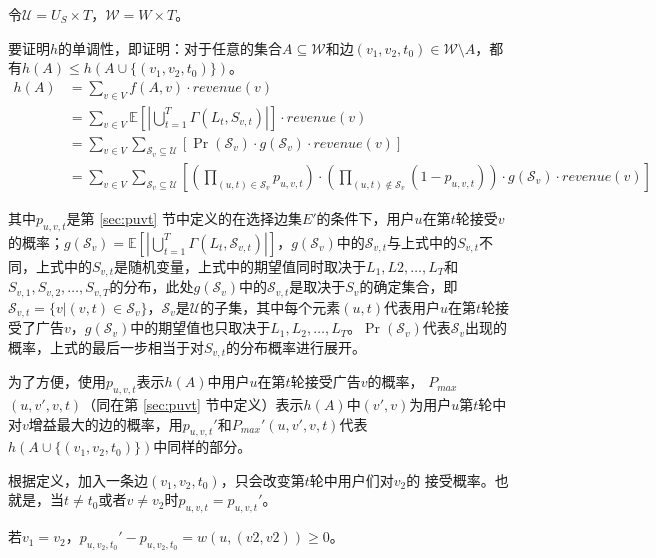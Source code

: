 令$\mathcal{U}=U_S \times T$，$\mathcal{W}=W \times T$。

要证明$h$的单调性，即证明：对于任意的集合$A \subseteq \mathcal{W}$和边$(v_1,v_2,t_0) \in \mathcal{W}\setminus A$，都有$h(A)\le h(A\cup\{(v_1,v_2,t_0)\})$。
\begin{align}
    h(A)&=\sum_{v \in V} f(A,v)\cdot revenue(v) \\ 
    &=\sum_{v \in V} \mathbb{E}\left[\left|\bigcup_{t=1}^{T}\Gamma(L_t,S_{v,t})\right|\right]\cdot revenue(v) \\
    &= \sum_{v\in V} \sum_{\mathcal{S}_v \subseteq \mathcal{U}} \left[\Pr(\mathcal{S}_v)\cdot g(\mathcal{S}_v)\cdot revenue(v)\right]\\ 
    &=\sum_{v\in V}\sum_{\mathcal{S}_v \subseteq \mathcal{U}}\left[\left(\prod_{(u,t)\in \mathcal{S}_v}p_{u,v,t}\right)\cdot \left(\prod_{(u,t) \notin \mathcal{S}_v} (1-p_{u,v,t})\right) \cdot g(\mathcal{S}_v)\cdot revenue(v)\right]     
\end{align}

\noindent 其中$p_{u,v,t}$是第 \ref{sec:puvt} 节中定义的在选择边集$E'$的条件下，用户$u$在第$t$轮接受$v$的概率；$g(\mathcal{S}_v)=\mathbb{E}\left[\left|\bigcup_{t=1}^{T}\Gamma(L_t,\mathcal{S}_{v,t})\right|\right] $，$g(\mathcal{S}_v)$中的$\mathcal{S}_{v,t}$与上式中的$S_{v,t}$不同，上式中的$S_{v,t}$是随机变量，上式中的期望值同时取决于$L_1,L2,\ldots,L_T$和$S_{v,1},S_{v,2},\ldots,S_{v,T}$的分布，此处$g(\mathcal{S}_v)$中的$\mathcal{S}_{v,t}$是取决于$S_v$的确定集合，即$\mathcal{S}_{v,t}=\{v|(v,t)\in \mathcal{S}_v\}$，$\mathcal{S}_v$是$\mathcal{U}$的子集，其中每个元素$(u,t)$代表用户$u$在第$t$轮接受了广告$v$，$g(\mathcal{S}_v)$中的期望值也只取决于$L_1,L_2,\ldots,L_T$。$\Pr(\mathcal{S}_v)$代表$\mathcal{S}_v$出现的概率，上式的最后一步相当于对$S_{v,t}$的分布概率进行展开。

为了方便，使用$p_{u,v,t}$表示$h(A)$中用户$u$在第$t$轮接受广告$v$的概率， $P_{max}$ $(u,v',v,t)$（同在第 \ref{sec:puvt} 节中定义）表示$h(A)$中$(v',v)$为用户$u$第$t$轮中对$v$增益最大的边的概率，用$p_{u,v,t}'$和$P_{max}'(u,v',v,t)$代表$h(A\cup\{(v_1,v_2,t_0)\})$中同样的部分。

根据定义，加入一条边$(v_1,v_2,t_0)$，只会改变第$t$轮中用户们对$v_2$的 接受概率。也就是，当$t\ne t_0$或者$v \ne v_2$时$p_{u,v,t}=p_{u,v,t}'$。

若$v_1 = v_2$，$p_{u,v_2,t_0}'-p_{u,v_2,t_0}=w(u,(v2,v2)) \ge 0$。

